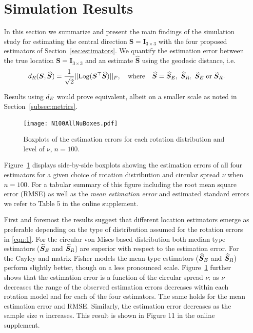 \section{Simulation Results}\label{sec:results}

In this section we summarize and present the main findings of the simulation study for  estimating the central direction $\bm S = \bm I_{3\times 3}$ with the four proposed estimators of Section~\ref{sec:estimators}. We quantify the estimation error between the true location $\bm S = \bm I_{3\times 3}$ and an estimate $\widehat{\bm S}$ using the geodesic distance, i.e.
\begin{equation}
{d_R}(\bm{S}, \widehat{\bm{S}}) =  \frac{1}{\sqrt{2}}||
\text{Log}(\bm{S}^\top\widehat{\bm{S}})||_F, \quad \mbox{where} \quad \widehat{\bm{S}} =  {\widehat{\bm S}_E}, \; {\widehat{\bm S}_R},\;  {\widetilde{\bm S}_E} \; \mbox{or} \; {\widetilde{\bm S}_R}.
\end{equation}

\noindent Results using ${d_E}$ would prove equivalent, albeit on a smaller scale as noted in Section~\ref{subsec:metrics}.   
\begin{figure}[h!]
\centering
\texttt{[image: N100AllNuBoxes.pdf]}
\caption{Boxplots of the estimation errors for each rotation distribution and level of $\nu$,  $n=100$.}
\label{fig:NuBoxes}
\end{figure}
Figure~\ref{fig:NuBoxes} displays side-by-side boxplots showing the estimation errors of all four estimators for a given choice of rotation distribution and circular spread $\nu$ when  $n=100$.   For a tabular summary of this figure including the root mean square error (RMSE)  as well as the \textit{mean estimation error} and estimated standard errors we refer to Table 5 in the online supplement. 

First and foremost the results suggest that different location estimators emerge as preferable depending on the type of distribution assumed for the rotation errors in \eqref{eqn:1}.  For the circular-von Mises-based distribution both median-type estimators (${\widetilde{\bm S}_E}$ and ${\widetilde{\bm S}_R}$) are superior with respect to the estimation error.  For the Cayley and matrix Fisher models the mean-type estimators (${\widehat{\bm S}_E}$ and ${\widehat{\bm S}_R}$) perform slightly better, though on a less pronounced scale.   Figure~\ref{fig:NuBoxes} further shows that the estimation error is a function of the circular spread $\nu$; as $\nu$ decreases the range of the observed estimation errors decreases within each rotation model and for each of the four estimators. The same holds for the mean estimation error and RMSE.  Similarly, the estimation error decreases as the sample size $n$ increases. This result is shown in Figure 11 in the online supplement.

